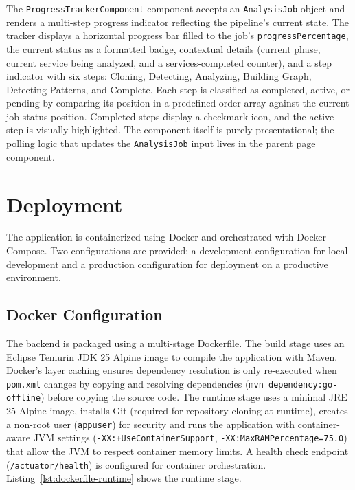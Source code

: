 \par The \texttt{ProgressTrackerComponent} component accepts an \texttt{AnalysisJob} object and renders a multi-step progress indicator reflecting the pipeline's current state. The tracker displays a horizontal progress bar filled to the job's \texttt{progress\-Per\-cen\-tage}, the current status as a formatted badge, contextual details (current phase, current service being analyzed, and a services-completed counter), and a step indicator with six steps: Cloning, Detecting, Analyzing, Building Graph, Detecting Patterns, and Complete. Each step is classified as completed, active, or pending by comparing its position in a predefined order array against the current job status position. Completed steps display a checkmark icon, and the active step is visually highlighted. The component itself is purely presentational; the polling logic that updates the \texttt{AnalysisJob} input lives in the parent page component.

\section{Deployment}
\label{sec:deployment}

\par The application is containerized using Docker and orchestrated with Docker Compose. Two configurations are provided: a development configuration for local development and a production configuration for deployment on a productive environment.

\subsection{Docker Configuration}
\label{subsec:docker-config}

\par The backend is packaged using a multi-stage Dockerfile. The build stage uses an Eclipse Temurin JDK 25 Alpine image to compile the application with Maven. Docker's layer caching ensures dependency resolution is only re-executed when \texttt{pom.xml} changes by copying and resolving dependencies (\texttt{mvn dependency:go-offline}) before copying the source code. The runtime stage uses a minimal JRE 25 Alpine image, installs Git (required for repository cloning at runtime), creates a non-root user (\texttt{appuser}) for security and runs the application with container-aware JVM settings (\texttt{-XX:+UseContainerSupport}, \texttt{-XX:MaxRAMPercentage=75.0}) that allow the JVM to respect container memory limits. A health check endpoint (\texttt{/actuator/health}) is configured for container orchestration. Listing~\ref{lst:dockerfile-runtime} shows the runtime stage.

